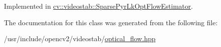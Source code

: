 Implemented in \hyperlink{classcv_1_1videostab_1_1SparsePyrLkOptFlowEstimator_a52ff8fabb0ea41c6f82a7c93fab6a54c}{cv\-::videostab\-::\-Sparse\-Pyr\-Lk\-Opt\-Flow\-Estimator}.



The documentation for this class was generated from the following file\-:\begin{DoxyCompactItemize}
\item 
/usr/include/opencv2/videostab/\hyperlink{videostab_2optical__flow_8hpp}{optical\-\_\-flow.\-hpp}\end{DoxyCompactItemize}
